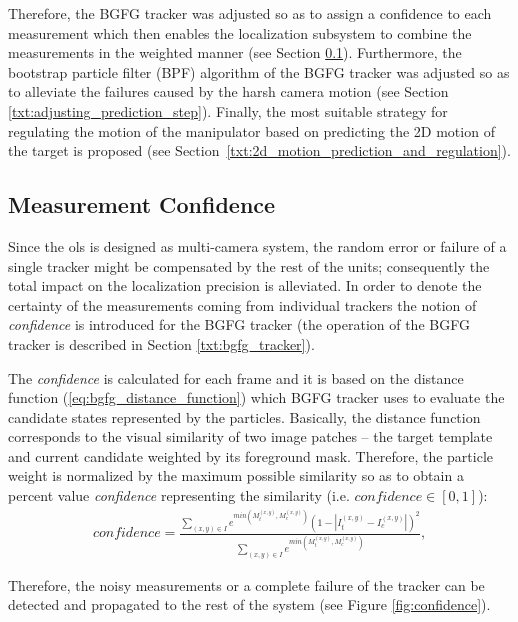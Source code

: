 Therefore, the BGFG tracker was adjusted so as to assign a confidence to each measurement which then enables the localization subsystem to combine the measurements in the weighted manner (see Section \ref{txt:measurement_confidence}). Furthermore, the bootstrap particle filter (BPF) algorithm of the BGFG tracker was adjusted so as to alleviate the failures caused by the harsh camera motion (see Section \ref{txt:adjusting_prediction_step}). Finally, the most suitable strategy for regulating the motion of the manipulator based on predicting the 2D motion of the target is proposed (see Section~\ref{txt:2d_motion_prediction_and_regulation}).

\subsection{Measurement Confidence} \label{txt:measurement_confidence}

Since the \gls{ols} is designed as multi-camera system, the random error or failure of a single tracker might be compensated by the rest of the units; consequently the total impact on the localization precision is alleviated. In order to denote the certainty of the measurements coming from individual trackers the notion of \textit{confidence} is introduced for the BGFG tracker (the operation of the BGFG tracker is described in Section \ref{txt:bgfg_tracker}).

The \textit{confidence} is calculated for each frame and it is based on the distance function (\ref{eq:bgfg_distance_function}) which BGFG tracker uses to evaluate the candidate states represented by the particles. Basically, the distance function corresponds to the visual similarity of two image patches -- the target template and current candidate weighted by its foreground mask. Therefore, the particle weight is normalized by the maximum possible similarity so as to obtain a percent value \textit{confidence} representing the similarity (i.e. $\textit{confidence} \in [0, 1]$):
\begin{align} \label{eq:confidence}
	confidence = \frac{\sum_{(x,y) \in I}{e^{min(M_{t}^{(x,y)}, M_{c}^{(x,y)})}(1 - |I_{t}^{(x,y)} - I_{c}^{(x,y)}|)^{2}}}{\sum_{(x,y) \in I}{e^{min(M_{t}^{(x,y)}, M_{c}^{(x,y)})}}},
\end{align}

Therefore, the noisy measurements or a complete failure of the tracker can be detected and propagated to the rest of the system (see Figure \ref{fig:confidence}).

